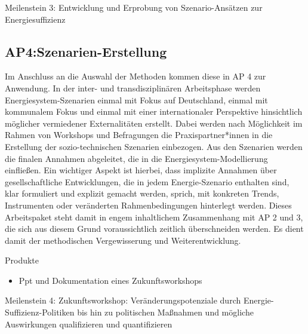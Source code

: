 \documentclass[a4paper,11pt,twoside]{scrartcl}
\begin{document}
Meilenstein 3: Entwicklung und Erprobung von Szenario-Ansätzen zur Energiesuffizienz

\subsection*{AP4:Szenarien-Erstellung}
Im Anschluss an die Auswahl der Methoden kommen diese in AP 4 zur Anwendung. In der inter- und transdisziplinären Arbeitsphase werden Energiesystem-Szenarien einmal mit Fokus auf Deutschland, einmal mit kommunalem Fokus und einmal mit einer internationaler Perspektive hinsichtlich möglicher vermiedener Externalitäten erstellt. Dabei werden nach Möglichkeit im Rahmen von Workshops und Befragungen die Praxispartner*innen in die Erstellung der sozio-technischen Szenarien einbezogen. Aus den Szenarien werden die finalen Annahmen abgeleitet, die in die Energiesystem-Modellierung einfließen. Ein wichtiger Aspekt ist hierbei, dass implizite Annahmen über gesellschaftliche Entwicklungen, die in jedem Energie-Szenario enthalten sind, klar formuliert und explizit gemacht werden, sprich, mit konkreten Trends, Instrumenten oder veränderten Rahmenbedingungen hinterlegt werden. Dieses Arbeitspaket steht damit in engem inhaltlichem Zusammenhang mit AP 2 und 3, die sich aus diesem Grund voraussichtlich zeitlich überschneiden werden. Es dient damit der methodischen Vergewisserung und Weiterentwicklung.

Produkte\\
\begin{itemize}
    \item Ppt und Dokumentation eines Zukunftsworkshops
\end{itemize}

Meilenstein 4: Zukunftsworkshop: Veränderungspotenziale durch Energie-Suffizienz-Politiken bis hin zu politischen Maßnahmen und mögliche Auswirkungen qualifizieren und quantifizieren 


\end{document}
